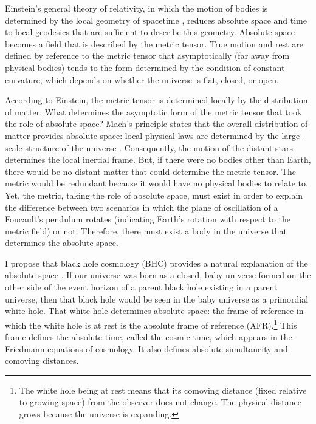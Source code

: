 \documentclass[prd,onecolumn,nofootinbib]{revtex4}
\begin{document}
Einstein's general theory of relativity, in which the motion of bodies is determined by the local geometry of spacetime \cite{LL2}, reduces absolute space and time to local geodesics that are sufficient to describe this geometry.
Absolute space becomes a field that is described by the metric tensor.
True motion and rest are defined by reference to the metric tensor that asymptotically (far away from physical bodies) tends to the form determined by the condition of constant curvature, which depends on whether the universe is flat, closed, or open.

According to Einstein, the metric tensor is determined locally by the distribution of matter.
What determines the asymptotic form of the metric tensor that took the role of absolute space?
Mach's principle states that the overall distribution of matter provides absolute space: local physical laws are determined by the large-scale structure of the universe \cite{Mach}.
Consequently, the motion of the distant stars determines the local inertial frame.
But, if there were no bodies other than Earth, there would be no distant matter that could determine the metric tensor.
The metric would be redundant because it would have no physical bodies to relate to.
Yet, the metric, taking the role of absolute space, must exist in order to explain the difference between two scenarios in which the plane of oscillation of a Foucault’s pendulum rotates (indicating Earth's rotation with respect to the metric field) or not.
Therefore, there must exist a body in the universe that determines the absolute space.

I propose that black hole cosmology (BHC) provides a natural explanation of the absolute space \cite{cosmo,ApJ,shear}.
If our universe was born as a closed, baby universe \cite{BHG} formed on the other side of the event horizon of a parent black hole existing in a parent universe, then that black hole would be seen in the baby universe as a primordial white hole.
That white hole determines absolute space: the frame of reference in which the white hole is at rest is the absolute frame of reference (AFR).\footnote{
The white hole being at rest means that its comoving distance (fixed relative to growing space) from the observer does not change.
The physical distance grows because the universe is expanding.
}
This frame defines the absolute time, called the cosmic time, which appears in the Friedmann equations of cosmology.
It also defines absolute simultaneity and comoving distances.
\end{document}
